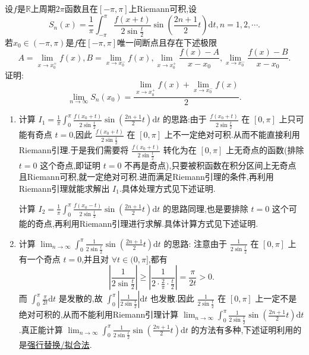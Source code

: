 \documentclass[../../main.tex]{subfiles}%
\begin{document}
\begin{example}
设\(f\)是\(\mathbb{R}\)上周期\(2\pi\)函数且在\([-\pi,\pi]\)上Riemann可积,设
\[
S_n(x)=\frac{1}{\pi}\int_{-\pi}^{\pi}\frac{f(x + t)}{2\sin\frac{t}{2}}\sin\left(\frac{2n + 1}{2}t\right)\mathrm{d}t,n = 1,2,\cdots.
\]
若\(x_0\in(-\pi,\pi)\)是\(f\)在\([-\pi,\pi]\)唯一间断点且存在下述极限
\[
A=\lim_{x\rightarrow x_0^{+}}f(x),B=\lim_{x\rightarrow x_0^{-}}f(x),\lim_{x\rightarrow x_0^{+}}\frac{f(x)-A}{x - x_0},\lim_{x\rightarrow x_0^{-}}\frac{f(x)-B}{x - x_0}.
\]
证明:
\[
\lim\limits_{n\rightarrow\infty}S_n(x_0)=\frac{\lim\limits_{x\rightarrow x_0^{+}}f(x)+\lim\limits_{x\rightarrow x_0^{-}}f(x)}{2}.
\]
\end{example}
\begin{note}
\begin{enumerate}[(1)]
\item 计算 \(I_1=\frac{1}{\pi}\int_0^{\pi}{\frac{f(x_0 + t)}{2\sin \frac{t}{2}}\sin \left( \frac{2n + 1}{2}t \right) \mathrm{d}t}\) 的思路:由于 \(\frac{f(x_0 + t)}{2\sin \frac{t}{2}}\) 在 \([0, \pi]\) 上只可能有奇点 \(t = 0\),因此 \(\frac{f(x_0 + t)}{2\sin \frac{t}{2}}\) 在 \([0, \pi]\) 上不一定绝对可积.从而不能直接利用Riemann引理.于是我们需要将 \(\frac{f(x_0 + t)}{2\sin \frac{t}{2}}\) 转化为在 \([0, \pi]\) 上无奇点的函数(排除 \(t = 0\) 这个奇点,即证明 \(t = 0\) 不再是奇点),只要被积函数在积分区间上无奇点且Riemann可积,就一定绝对可积.进而满足Riemann引理的条件,再利用Riemann引理就能求解出 \(I_1\).具体处理方式见下述证明.

计算 \(I_2=\frac{1}{\pi}\int_0^{\pi}{\frac{f(x_0 - t)}{2\sin \frac{t}{2}}\sin \left( \frac{2n + 1}{2}t \right) \mathrm{d}t}\) 的思路同理,也是要排除 \(t = 0\) 这个可能的奇点,再利用Riemann引理进行求解.具体计算方式见下述证明.

\item 计算 \(\lim_{n\rightarrow \infty} \int_0^{\pi}{\frac{1}{2\sin \frac{t}{2}}\sin \left( \frac{2n + 1}{2}t \right) \mathrm{d}t}\) 的思路:
注意由于 \(\frac{1}{2\sin \frac{t}{2}}\) 在 \([0, \pi]\) 上有一个奇点 \(t = 0\),并且对 \(\forall t\in (0, \pi]\),都有
\[
\left| \frac{1}{2\sin \frac{t}{2}} \right|\geqslant \left| \frac{1}{2\cdot \frac{2}{\pi}\cdot \frac{t}{2}} \right|=\frac{\pi}{2t}>0.
\]
而 \(\int_0^{\pi}{\frac{\pi}{2t}\mathrm{d}t}\) 是发散的,故 \(\int_0^{\pi}{\left| \frac{1}{2\sin \frac{t}{2}} \right|\mathrm{d}t}\) 也发散.因此 \(\frac{1}{2\sin \frac{t}{2}}\) 在 \([0, \pi]\) 上一定不是绝对可积的,从而不能利用Riemann引理计算 \(\lim_{n\rightarrow \infty} \int_0^{\pi}{\frac{1}{2\sin \frac{t}{2}}\sin \left( \frac{2n + 1}{2}t \right) \mathrm{d}t}\).真正能计算 \(\lim_{n\rightarrow \infty} \int_0^{\pi}{\frac{1}{2\sin \frac{t}{2}}\sin \left( \frac{2n + 1}{2}t \right) \mathrm{d}t}\) 的方法有多种,下述证明利用的是\hyperref[强行替换(拟合法)和凑定积分]{强行替换/拟合法}.
\end{enumerate}
\end{note}
\end{document}
